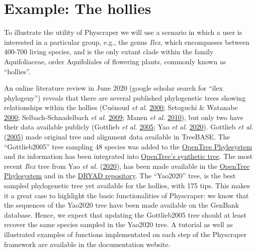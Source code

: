 \documentclass[]{article}
\begin{document}
\hypertarget{example-the-hollies}{%
\section{Example: The hollies}\label{example-the-hollies}}

To illustrate the utility of Physcraper we will use a scenario in which a user is interested in a particular group, e.g., the genus \emph{Ilex}, which encompasses between 400-700 living species, and is the only extant clade within the family Aquifoliaceae, order Aquifoliales of flowering plants, commonly known as ``hollies''.

An online literature review in June 2020 (google scholar search for ``ilex phylogeny'') reveals that there are several published phylogenetic trees showing relationships within the hollies (Cuénoud \emph{et al.} \protect\hyperlink{ref-cuenoud2000molecular}{2000}; Setoguchi \& Watanabe \protect\hyperlink{ref-setoguchi2000intersectional}{2000}; Selbach-Schnadelbach \emph{et al.} \protect\hyperlink{ref-selbach2009new}{2009}; Manen \emph{et al.} \protect\hyperlink{ref-manen2010history}{2010}), but only two have their data available publicly (Gottlieb \emph{et al.} \protect\hyperlink{ref-gottlieb2005molecular}{2005}; Yao \emph{et al.} \protect\hyperlink{ref-yao2020phylogeny}{2020}).
Gottlieb \emph{et al.} (\protect\hyperlink{ref-gottlieb2005molecular}{2005}) made original tree and alignment data available in TreeBASE. The ``Gottlieb2005'' tree sampling 48 species was added to the \href{https://tree.opentreeoflife.org/curator/study/edit/pg_2827/?tab=home}{OpenTree Phylesystem} and its information has been integrated into \href{https://devtree.opentreeoflife.org/opentree/opentree12.3@mrcaott68451ott89474/Ilex-theizans--Ilex-dumosa}{OpenTree's synthetic tree}.
The most recent \emph{Ilex} tree from Yao \emph{et al.} (\protect\hyperlink{ref-yao2020phylogeny}{2020}), has been made available in the \href{https://tree.opentreeoflife.org/curator/study/view/ot_1984}{OpenTree Phylesystem} and in the \href{https://datadryad.org/stash/dataset/doi:10.5061/dryad.k0p2ngf4x}{DRYAD repository}. The ``Yao2020'' tree, is the best sampled phylogenetic tree yet available for the hollies, with 175 tips.
This makes it a great case to highlight the basic functionalities of Physcraper: we know that the sequences of the Yao2020 tree have been made available on the GenBank database. Hence, we expect that updating the Gottlieb2005 tree should at least recover the same species sampled in the Yao2020 tree.
A tutorial as well as illustrated examples of functions implementated on each step of the Physcraper framework are available in the documentation website.
\end{document}
